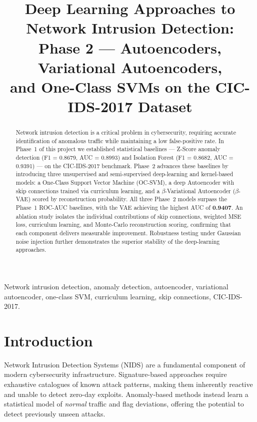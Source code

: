 \documentclass[conference]{IEEEtran}
\title{Deep Learning Approaches to Network Intrusion Detection:\\
       Phase 2 — Autoencoders, Variational Autoencoders,\\
       and One-Class SVMs on the CIC-IDS-2017 Dataset}
\author{%
  \IEEEauthorblockN{Prerak Arya}
  \IEEEauthorblockA{Roll No.\ 230039\\
    Department of Computer Science \& Engineering}
  \and
  \IEEEauthorblockN{Saikiran Bompelliwar}
  \IEEEauthorblockA{Roll No.\ 230046\\
    Department of Computer Science \& Engineering}
}
\begin{document}
\maketitle

\begin{abstract}
Network intrusion detection is a critical problem in cybersecurity, requiring
accurate identification of anomalous traffic while maintaining a low false-positive
rate. In Phase~1 of this project we established statistical baselines ---
Z-Score anomaly detection (F1 = 0.8679, AUC = 0.8993) and Isolation Forest
(F1 = 0.8682, AUC = 0.9391) --- on the CIC-IDS-2017 benchmark. Phase~2 advances
these baselines by introducing three unsupervised and semi-supervised deep-learning
and kernel-based models: a One-Class Support Vector Machine (OC-SVM), a deep
Autoencoder with skip connections trained via curriculum learning, and a
$\beta$-Variational Autoencoder ($\beta$-VAE) scored by reconstruction
probability. All three Phase~2 models surpass the Phase~1 ROC-AUC
baselines, with the VAE achieving the highest AUC of \textbf{0.9407}. An
ablation study isolates the individual contributions of skip connections,
weighted MSE loss, curriculum learning, and Monte-Carlo reconstruction
scoring, confirming that each component delivers measurable improvement.
Robustness testing under Gaussian noise injection further demonstrates
the superior stability of the deep-learning approaches.
\end{abstract}

\begin{IEEEkeywords}
Network intrusion detection, anomaly detection, autoencoder, variational
autoencoder, one-class SVM, curriculum learning, skip connections, CIC-IDS-2017.
\end{IEEEkeywords}

\section{Introduction}

Network Intrusion Detection Systems (NIDS) are a fundamental component of
modern cybersecurity infrastructure. Signature-based approaches require
exhaustive catalogues of known attack patterns, making them inherently
reactive and unable to detect zero-day exploits. Anomaly-based methods
instead learn a statistical model of \emph{normal} traffic and flag
deviations, offering the potential to detect previously unseen attacks.
\end{document}
